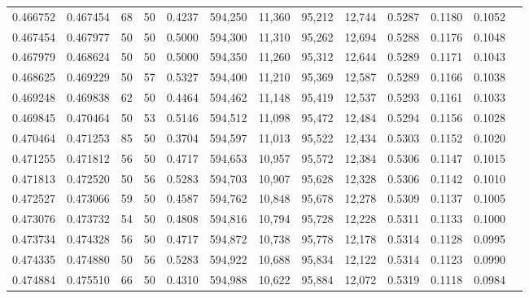 \begin{tabular}{rrrrrrrrrrrrr}
0.466752 & 0.467454 &    68 &  50 &                                     0.4237 & 594,250 &  11,360 &  95,212 &  12,744 & 0.5287 & 0.1180 & 0.1052 \\
0.467454 & 0.467977 &    50 &  50 &                                     0.5000 & 594,300 &  11,310 &  95,262 &  12,694 & 0.5288 & 0.1176 & 0.1048 \\
0.467979 & 0.468624 &    50 &  50 &                                     0.5000 & 594,350 &  11,260 &  95,312 &  12,644 & 0.5289 & 0.1171 & 0.1043 \\
0.468625 & 0.469229 &    50 &  57 &                                     0.5327 & 594,400 &  11,210 &  95,369 &  12,587 & 0.5289 & 0.1166 & 0.1038 \\
0.469248 & 0.469838 &    62 &  50 &                                     0.4464 & 594,462 &  11,148 &  95,419 &  12,537 & 0.5293 & 0.1161 & 0.1033 \\
0.469845 & 0.470464 &    50 &  53 &                                     0.5146 & 594,512 &  11,098 &  95,472 &  12,484 & 0.5294 & 0.1156 & 0.1028 \\
0.470464 & 0.471253 &    85 &  50 &                                     0.3704 & 594,597 &  11,013 &  95,522 &  12,434 & 0.5303 & 0.1152 & 0.1020 \\
0.471255 & 0.471812 &    56 &  50 &                                     0.4717 & 594,653 &  10,957 &  95,572 &  12,384 & 0.5306 & 0.1147 & 0.1015 \\
0.471813 & 0.472520 &    50 &  56 &                                     0.5283 & 594,703 &  10,907 &  95,628 &  12,328 & 0.5306 & 0.1142 & 0.1010 \\
0.472527 & 0.473066 &    59 &  50 &                                     0.4587 & 594,762 &  10,848 &  95,678 &  12,278 & 0.5309 & 0.1137 & 0.1005 \\
0.473076 & 0.473732 &    54 &  50 &                                     0.4808 & 594,816 &  10,794 &  95,728 &  12,228 & 0.5311 & 0.1133 & 0.1000 \\
0.473734 & 0.474328 &    56 &  50 &                                     0.4717 & 594,872 &  10,738 &  95,778 &  12,178 & 0.5314 & 0.1128 & 0.0995 \\
0.474335 & 0.474880 &    50 &  56 &                                     0.5283 & 594,922 &  10,688 &  95,834 &  12,122 & 0.5314 & 0.1123 & 0.0990 \\
0.474884 & 0.475510 &    66 &  50 &                                     0.4310 & 594,988 &  10,622 &  95,884 &  12,072 & 0.5319 & 0.1118 & 0.0984 \\

\end{tabular}
